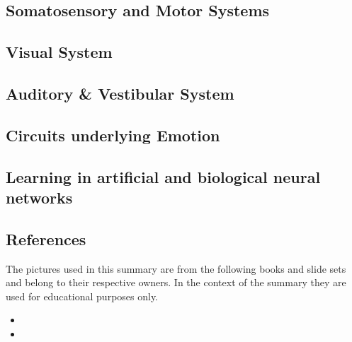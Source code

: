 \documentclass[11pt,article,oneside,a4paper]{memoir}
\begin{document}
\subsection{Somatosensory and Motor Systems}
\subsection{Visual System}
\subsection{Auditory \& Vestibular System}
\subsection{Circuits underlying Emotion}
\subsection{Learning in artificial and biological neural networks}

\newpage

\subsection{References}
The pictures used in this summary are from the following books and slide sets
and belong to their respective owners. In the context of the summary they are
used for educational purposes only.
\begin{itemize}
\item
\item
\end{itemize}
\end{document}
